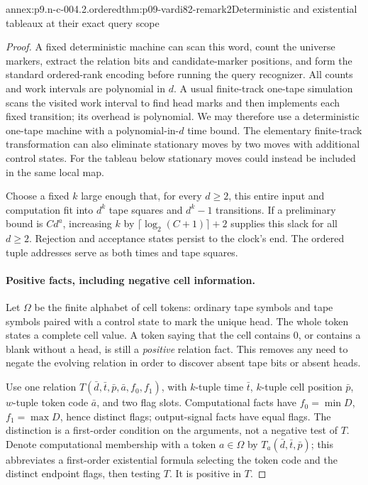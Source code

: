 \begin{annexitem}{annex:p9.n-c-004.2.ordered}{thm:p09-vardi82-remark2}{Deterministic and existential tableaux at their exact query scope}
\begin{proof}
A fixed deterministic machine can scan this word, count the universe markers,
extract the relation bits and candidate-marker positions, and form the
standard ordered-rank encoding before running the query recognizer.  All
counts and work intervals are polynomial in \(d\).  A usual finite-track
one-tape simulation scans the visited work interval to find head marks and
then implements each fixed transition; its overhead is polynomial.  We may
therefore use a deterministic one-tape machine with a polynomial-in-\(d\)
time bound.  The elementary finite-track transformation can also eliminate
stationary moves by two moves with additional control states.  For the tableau
below stationary moves could instead be included in the same local map.

Choose a fixed \(k\) large enough that, for every \(d\geq2\), this
entire input and computation fit into \(d^k\) tape squares and
\(d^k-1\) transitions.  If a preliminary bound is \(C d^a\), increasing
\(k\) by \(\lceil\log_2(C+1)\rceil+2\) supplies this slack for all
\(d\geq2\).  Rejection and acceptance states persist to the clock's end.
The ordered tuple addresses serve as both times and tape squares.

\paragraph{Positive facts, including negative cell information.}
Let \(\Omega\) be the finite alphabet of cell tokens: ordinary tape symbols
and tape symbols paired with a control state to mark the unique head.
The whole token states a complete cell value.  A token saying that the cell
contains 0, or contains a blank without a head, is still a \emph{positive}
relation fact.  This removes any need to negate the evolving relation in
order to discover absent tape bits or absent heads.

Use one relation
\(T(\bar d,\bar t,\bar p,\bar a,f_0,f_1)\), with \(k\)-tuple time
\(\bar t\), \(k\)-tuple cell position \(\bar p\), \(w\)-tuple
token code \(\bar a\), and two flag slots.  Computational facts have
\(f_0=\min D\), \(f_1=\max D\), hence distinct flags; output-signal
facts have equal flags.  The distinction is a first-order condition on
the arguments, not a negative test of \(T\).
Denote computational membership with a token \(a\in\Omega\) by
\(T_a(\bar d,\bar t,\bar p)\); this abbreviates a first-order existential
formula selecting the token code and the distinct endpoint flags, then
testing \(T\).  It is positive in \(T\).


\end{proof}
\end{annexitem}
